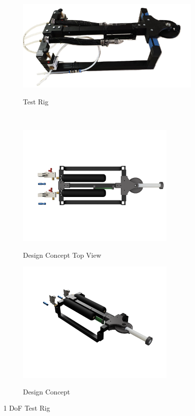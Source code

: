\documentclass[11pt,a4paper]{article}
\begin{document}
\begin{figure}[!hbt]
    \centering
    \begin{subfigure}[t]{0.95 \textwidth}
        \centering
        \caption{Test Rig}
        \includegraphics[scale=0.2]{Test_Rig_Photo.png}
        \label{fig:test_rig_photo}
    \end{subfigure}\\
    \begin{subfigure}[t]{0.45 \textwidth}
        \centering
        \caption{Design Concept Top View}
        \includegraphics[height=6cm, trim={1cm 2cm 1cm 1cm},clip]{Testrig_top.PNG}
        \label{fig:test_rig_design_top}
    \end{subfigure}
    \begin{subfigure}[t]{0.45 \textwidth}
        \centering
        \caption{Design Concept}
        \includegraphics[height=6cm, trim={1cm 2cm 1cm 1cm},clip]{Testrig_home.PNG}
        \label{fig:test_rig_design}
    \end{subfigure}
    \caption{1 DoF Test Rig}
    \label{fig:test_rig}
\end{figure}
\end{document}
